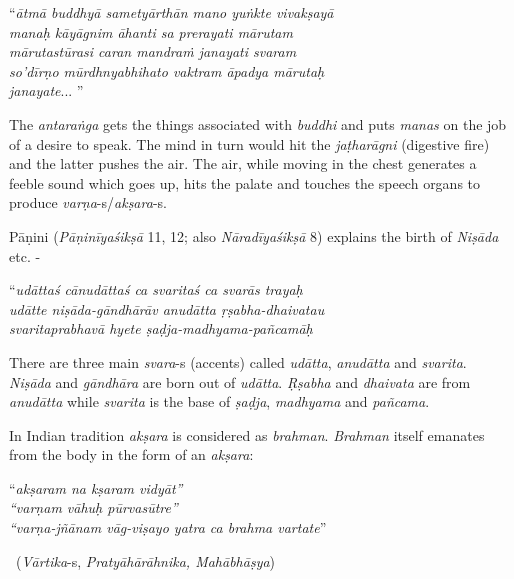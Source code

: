 \begin{longquote}
“\textit{ātmā buddhyā sametyārthān mano yuṅkte vivakṣayā }\\ \textit{manaḥ kāyāgnim āhanti sa prerayati mārutam }\\ \textit{mārutastūrasi caran mandraṁ janayati svaram }\\ \textit{so’dīrṇo mūrdhnyabhihato vaktram āpadya mārutaḥ }\\ \textit{janayate}... ”
\end{longquote}

The \textit{antaraṅga} gets the things associated with \textit{buddhi} and puts \textit{manas} on the job of a desire to speak. The mind in turn would hit the \textit{jaṭharāgni} (digestive fire) and the latter pushes the air. The air, while moving in the chest generates a feeble sound which goes up, hits the palate and touches the speech organs to produce \textit{varṇa}-s/\textit{akṣara}-s.

Pāṇini (\textit{Pāṇinīyaśikṣā} 11, 12; also \textit{Nāradīyaśikṣā} 8) explains the birth of \textit{Niṣāda} etc. -

\begin{longquote}
“\textit{udāttaś cānudāttaś ca svaritaś ca svarās trayaḥ }\\ \textit{udātte niṣāda-gāndhārāv anudātta ṛṣabha-dhaivatau }\\\textit{svaritaprabhavā hyete ṣaḍja-madhyama-pañcamāḥ} 
\end{longquote}

There are three main \textit{svara}-s (accents) called \textit{udātta}, \textit{anudātta} and \textit{svarita}. \textit{Niṣāda} and \textit{gāndhāra} are born out of \textit{udātta}. \textit{Ṛṣabha} and \textit{dhaivata} are from \textit{anudātta} while \textit{svarita} is the base of \textit{ṣaḍja}, \textit{madhyama} and \textit{pañcama}.

In Indian tradition \textit{akṣara} is considered as \textit{brahman}. \textit{Brahman} itself emanates from the body in the form of an \textit{akṣara}:


\begin{longquote}
“\textit{akṣaram na kṣaram vidyāt”}\\ \textit{“varṇam vāhuḥ pūrvasūtre”}\\ \textit{“varṇa-jñānam vāg-viṣayo yatra ca brahma vartate}” 

~\hfill (\textit{Vārtika}-s, \textit{Pratyāhārāhnika, Mahābhāṣya})
\end{longquote}

